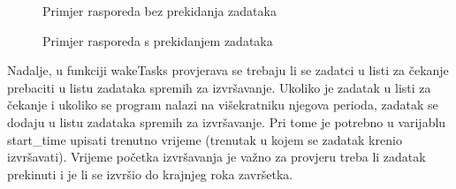 \documentclass[../zavrsni.tex]{subfiles}
\begin{document}
\begin{figure}[h]
    \centering

    \begin{RTGrid}[width=7cm]{3}{8}

  



  


    \end{RTGrid}

    \caption{Primjer rasporeda bez prekidanja zadataka}
    \label{fig:ex1}
  \end{figure}

  \begin{figure}[h]
    \centering

    \begin{RTGrid}[width=7cm]{3}{8}

  



  


    \end{RTGrid}

    \caption{Primjer rasporeda s prekidanjem zadataka}
    \label{fig:ex1}
  \end{figure}

Nadalje, u funkciji wakeTasks provjerava se trebaju li se zadatci u listi za čekanje prebaciti u listu zadataka spremih za izvršavanje.
Ukoliko je zadatak u listi za čekanje i ukoliko se program nalazi na višekratniku njegova perioda, zadatak se dodaju u listu 
zadataka spremih za izvršavanje. Pri tome je potrebno u varijablu start\_time upisati trenutno vrijeme (trenutak u kojem se zadatak 
krenio izvršavati). Vrijeme početka izvršavanja je važno za provjeru treba li zadatak prekinuti i je li se izvršio do krajnjeg roka 
završetka.
\end{document}
